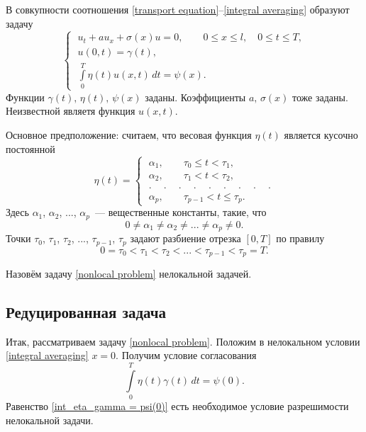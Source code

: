 \documentclass{article}
\renewcommand{\le}{\leqslant}
\theoremstyle{definition}
\begin{document}
В совкупности соотношения \eqref{transport equation}--\eqref{integral averaging} образуют задачу
\begin{equation} \label{nonlocal problem}
\begin{cases}
	\; u_t + au_x + \sigma(x)u = 0, \qquad 0 \le x \le l, \quad 0 \le t \le T, \\[3mm]
	\; u(0,t) = \gamma(t), \\[1mm]
	\; \int\limits_{0}^{T} \eta(t) u(x,t)\,dt = \psi(x).
\end{cases}
\end{equation}
Функции $ \gamma(t), \, \eta(t), \, \psi(x)$ заданы.
Коэффициенты $ a, \, \sigma(x)$ тоже заданы. 
Неизвестной являетя функция $ u(x,t) $.

Основное предположение: считаем, что весовая функция $ \eta(t) $ является кусочно постоянной
\begin{equation} \label{eta(t)}
\eta(t) = 
	\begin{cases}
	\; \alpha_1, \qquad \tau_0 \le t < \tau_1, \\
	\; \alpha_2, \qquad \tau_1 < t < \tau_2, \\
	\; .\phantom{-}.\phantom{-}.\phantom{-}.\phantom{-}.\phantom{-}.\phantom{-}.\phantom{-}.\phantom{-}. \\
	\; \alpha_p, \qquad \tau_{p - 1} < t \le \tau_p.
	\end{cases}
\end{equation}
Здесь $\alpha_1$, $\alpha_2$, ..., $\alpha_p$~--- вещественные константы, такие, что
\begin{equation*}
	0 \not= \alpha_1 \not= \alpha_2 \not= ... \not= \alpha_p \not= 0.
\end{equation*}
Точки $\tau_0$, $\tau_1$, $\tau_2$, ..., $\tau_{p - 1}$, $\tau_p$ задают разбиение отрезка $[0,T]$ по правилу
\begin{equation*}
	0 = \tau_0 < \tau_1 < \tau_2 < ... < \tau_{p - 1} < \tau_p = T.
\end{equation*}

Назовём задачу \eqref{nonlocal problem} нелокальной задачей.

\subsection{Редуцированная задача}

Итак, рассматриваем задачу \eqref{nonlocal problem}. Положим в нелокальном условии \eqref{integral averaging} \linebreak $x = 0$. 
Получим условие согласования
\begin{equation} \label{int_eta_gamma = psi(0)}
	\int\limits_{0}^{T} \eta(t) \gamma(t)\,dt = \psi(0).
\end{equation}
Равенство \eqref{int_eta_gamma = psi(0)} есть необходимое условие разрешимости нелокальной задачи.
\end{document}
